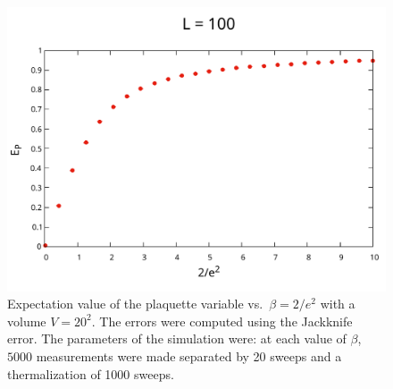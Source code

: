 \documentclass[12pt,a4paper]{article}
\begin{document}
	\begin{figure}
		\centering
		\includegraphics[scale=0.6]{L=100_n_term=1000-nmeas=5000-nskip=20.pdf}
		\caption{Expectation value of the plaquette variable vs.\ $\beta = 2/e^2$ with a volume $V = 20^2$. The errors were computed using the Jackknife error. The parameters of the simulation were: at each value of $\beta$, $5000$ measurements were made separated by 20 sweeps and a thermalization of 1000 sweeps.}
	\end{figure}
\end{document}
